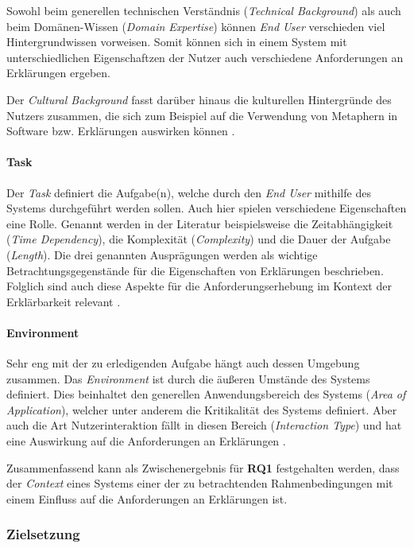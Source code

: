 Sowohl beim generellen technischen Verständnis (\textit{Technical Background}) als auch beim Domänen-Wissen (\textit{Domain Expertise}) \cite{yamada_evaluating_2016} können \textit{End User} verschieden viel Hintergrundwissen vorweisen. Somit können sich in einem System mit unterschiedlichen Eigenschaftzen der  Nutzer auch verschiedene Anforderungen an Erklärungen ergeben.

Der \textit{Cultural Background} fasst darüber hinaus die kulturellen Hintergründe des Nutzers zusammen, die sich zum Beispiel auf die Verwendung von Metaphern in Software bzw. Erklärungen auswirken können \cite{salgado_cultural_2015}.

\paragraph{Task} Der \textit{Task} definiert die Aufgabe(n), welche durch den \textit{End User} mithilfe des Systems durchgeführt werden sollen. Auch hier spielen verschiedene Eigenschaften eine Rolle. Genannt werden in der Literatur beispielsweise die Zeitabhängigkeit (\textit{Time Dependency}), die Komplexität (\textit{Complexity}) und die Dauer der Aufgabe (\textit{Length}). Die drei genannten Ausprägungen werden als wichtige Betrachtungsgegenstände für die Eigenschaften von Erklärungen beschrieben. Folglich sind auch diese Aspekte für die Anforderungserhebung im Kontext der Erklärbarkeit relevant \cite{sokol_explainability_2020}.

\paragraph{Environment} Sehr eng mit der zu erledigenden Aufgabe hängt auch dessen Umgebung zusammen. Das \textit{Environment} ist durch die äußeren Umstände des Systems definiert. Dies beinhaltet den generellen Anwendungsbereich des Systems (\textit{Area of Application}), welcher unter anderem die Kritikalität des Systems definiert. Aber auch die Art Nutzerinteraktion fällt in diesen Bereich (\textit{Interaction Type}) und hat eine Auswirkung auf die Anforderungen an Erklärungen \cite{wiegand_id_2020}. 

\bigskip

Zusammenfassend kann als Zwischenergebnis für \textbf{RQ1} festgehalten werden, dass der \textit{Context} eines Systems einer der zu betrachtenden Rahmenbedingungen mit einem Einfluss auf die Anforderungen an Erklärungen ist.

\subsubsection{Zielsetzung}
\label{subsec:model_objective}

